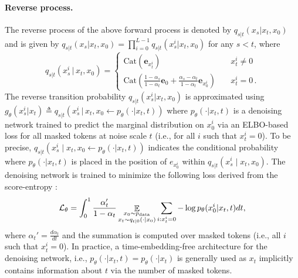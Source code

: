 \documentclass{article}
\newcommand{\kulin}[1]{{\color{blue} Kulin: #1}}
\newcommand{\mask}{0}
\theoremstyle{plain}
\theoremstyle{definition}
\theoremstyle{remark}
\begin{document}
\paragraph{Reverse process.} The reverse process of the above forward process is denoted by $q_{s|t}(x_s | x_t, x_0)$ and is given by $q_{s|t}(x_s | x_t, x_0) = \prod_{i=0}^{L-1} q_{s|t}(x_s^{i} | x_t, x_0)$ for any $s<t$, where
\begin{equation*}
     q_{s|t}(x_s^i \, \lvert\, x_t, x_0) = \begin{cases} 
       \mathrm{Cat}(\mathbf{e}_{x_t^{i}}) \quad & x_t^i \ne  0 \\
     \mathrm{Cat}\left(\frac{1-\alpha_s}{1-\alpha_t}\mathbf{e}_0 + \frac{\alpha_s - \alpha_t}{1-\alpha_t}\mathbf{e}_{x_0^i}\right)
  \quad &x_t^i= 0\,. 
     \end{cases}
\end{equation*}
The reverse transition probability $q_{s|t}(x_s^i | x_t, x_0)$ is approximated using $g_{\theta}(x_s^i | x_t) \triangleq q_{s|t}(x_s^i \, \lvert\, x_t, x_0 \leftarrow p_{\theta}(  \cdot | x_t, t) )$ where $p_\theta( \cdot | x_t,t)$ is a denoising network trained to predict the marginal distribution on $x_0^i$ via an ELBO-based loss for all masked tokens at noise scale $t$ (i.e., for all $i$ such that $x_t^i = 0$). To be precise, $q_{s|t} \left( x_s^i \mid x_t, x_0 \leftarrow p_{\theta}( \cdot | x_t, t) \right)$ indicates the conditional probability where $p_{\theta}(\cdot | x_t, t)$ is placed in the position of $e_{x_0^i}$ within $q_{s|t}(x_s^i \mid x_t, x_0)$. The denoising network is trained to minimize the following loss derived from the score-entropy \cite{lou2024discrete, sahoo2024simple, shi2025simplified, ou2024absorbing}:
\begin{equation*}
    \mathcal{L}_\theta = \int_{0}^1 \frac{\alpha_t'}{1-\alpha_t} \displaystyle \mathop{\mathbb{E}}_{ \substack{x_0 \sim p_{\rm data} \\ x_t \sim q_{t|0}(\cdot | x_0)}  }  
    \sum_{i: x_t^i = 0} -\log p_\theta(x_0^i | x_t,t)  dt,
\end{equation*}
where $\alpha_t'=\frac{d \alpha_t}{dt}$ and the summation is computed over masked tokens (i.e., all $i$ such that $x_t^i = \mask$). In practice, a time-embedding-free architecture for the denoising network, i.e., $p_\theta( \cdot | x_t, t) = p_\theta(\cdot | x_t)$ is generally used as \(x_t\) implicitly contains information about \(t\) via the number of masked tokens.
\end{document}
